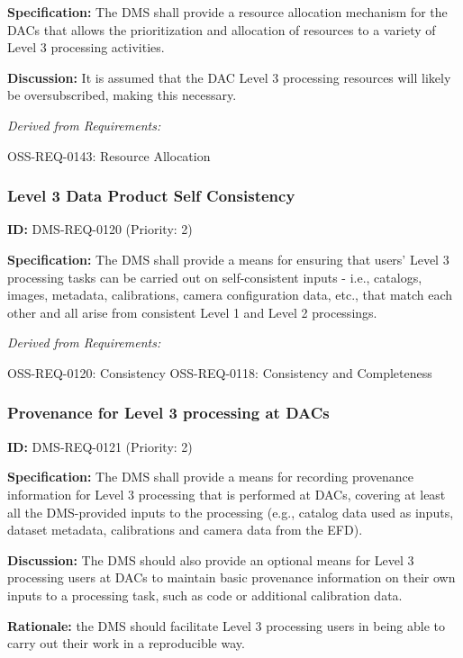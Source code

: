 \documentclass[SE,toc,lsstdraft]{lsstdoc}
\begin{document}
\textbf{Specification:} The DMS shall provide a resource allocation mechanism for the DACs that allows the prioritization and allocation of resources to a variety of Level 3 processing activities.

\textbf{Discussion:} It is assumed that the DAC Level 3 processing resources will likely be oversubscribed, making this necessary.

\emph{Derived from Requirements:}

OSS-REQ-0143:
Resource Allocation \newline

\subsubsection{Level 3 Data Product Self Consistency}

\label{DMS-REQ-0120}
\textbf{ID:} DMS-REQ-0120 (Priority: 2)

\textbf{Specification:} The DMS shall provide a means for ensuring that users' Level 3 processing tasks can be carried out on self-consistent inputs - i.e., catalogs, images, metadata, calibrations, camera configuration data, etc., that match each other and all arise from consistent Level 1 and Level 2 processings.

\emph{Derived from Requirements:}

OSS-REQ-0120:
Consistency \newline
OSS-REQ-0118:
Consistency and Completeness \newline

\subsubsection{Provenance for Level 3 processing at DACs}

\label{DMS-REQ-0121}
\textbf{ID:} DMS-REQ-0121 (Priority: 2)

\textbf{Specification:} The DMS shall provide a means for recording provenance information for Level 3 processing that is performed at DACs, covering at least all the DMS-provided inputs to the processing (e.g., catalog data used as inputs, dataset metadata, calibrations and camera data from the EFD).

\textbf{Discussion:} The DMS should also provide an optional means for Level 3 processing users at DACs to maintain basic provenance information on their own inputs to a processing task, such as code or additional calibration data.

\textbf{Rationale:} the DMS should facilitate Level 3 processing users in being able to carry out their work in a reproducible way.
\end{document}

